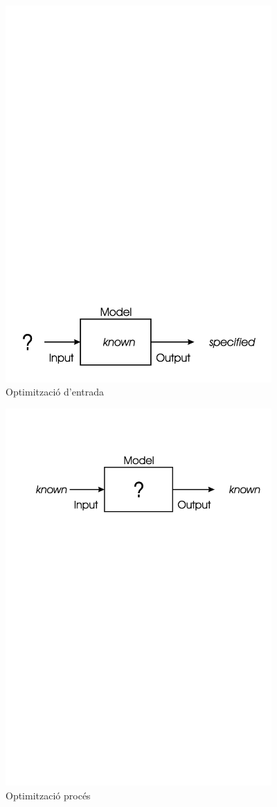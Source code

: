 \documentclass[titlepage,a4paper,12pt]{book}
\begin{document}
\begin{figure} \centering \includegraphics[width=4in]{intro/1-4.jpg}
\caption{\label{fig:ch1-4}Optimització d'entrada}
\end{figure}
\begin{figure} \centering \includegraphics[width=4in]{intro/1-5.jpg}
\caption{\label{fig:ch1-5}Optimització procés}
\end{figure}
\end{document}
